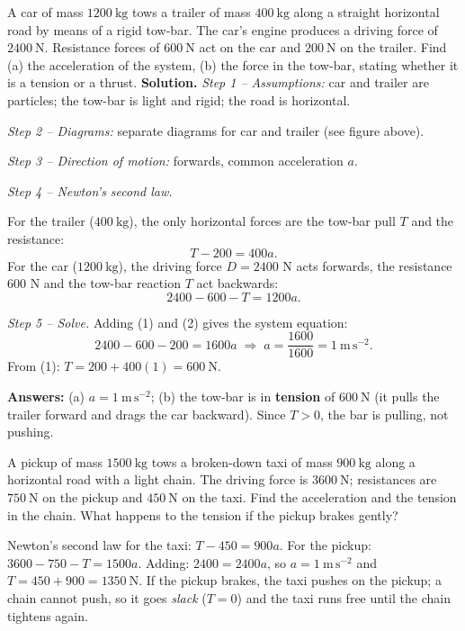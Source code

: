 \documentclass[11pt]{article}
\begin{document}
\begin{exoresolu}
A car of mass $1200\ \mathrm{kg}$ tows a trailer of mass $400\ \mathrm{kg}$ along a straight horizontal road by means of a rigid tow-bar. The car's engine produces a driving force of $2400\ \mathrm{N}$. Resistance forces of $600\ \mathrm{N}$ act on the car and $200\ \mathrm{N}$ on the trailer. Find (a) the acceleration of the system, (b) the force in the tow-bar, stating whether it is a tension or a thrust.
\tcblower
\textbf{Solution.} \emph{Step 1 -- Assumptions:} car and trailer are particles; the tow-bar is light and rigid; the road is horizontal.

\emph{Step 2 -- Diagrams:} separate diagrams for car and trailer (see figure above).

\emph{Step 3 -- Direction of motion:} forwards, common acceleration $a$.

\emph{Step 4 -- Newton's second law.}

For the trailer ($400\ \mathrm{kg}$), the only horizontal forces are the tow-bar pull $T$ and the resistance:
\[
T - 200 = 400a. \tag{1}
\]
For the car ($1200\ \mathrm{kg}$), the driving force $D=2400$ N acts forwards, the resistance $600$ N and the tow-bar reaction $T$ act backwards:
\[
2400 - 600 - T = 1200a. \tag{2}
\]

\emph{Step 5 -- Solve.} Adding (1) and (2) gives the system equation:
\[
2400 - 600 - 200 = 1600a \;\Longrightarrow\; a = \frac{1600}{1600} = 1\ \mathrm{m\,s^{-2}}.
\]
From (1): $T = 200 + 400(1) = 600\ \mathrm{N}$.

\textbf{Answers:} (a) $a = 1\ \mathrm{m\,s^{-2}}$; (b) the tow-bar is in \textbf{tension} of $600\ \mathrm{N}$ (it pulls the trailer forward and drags the car backward). Since $T>0$, the bar is pulling, not pushing.
\end{exoresolu}

\begin{exercice}
A pickup of mass $1500\ \mathrm{kg}$ tows a broken-down taxi of mass $900\ \mathrm{kg}$ along a horizontal road with a light chain. The driving force is $3600\ \mathrm{N}$; resistances are $750\ \mathrm{N}$ on the pickup and $450\ \mathrm{N}$ on the taxi. Find the acceleration and the tension in the chain. What happens to the tension if the pickup brakes gently?
\end{exercice}

\begin{corrige}[Exercise 1]
Newton's second law for the taxi: $T - 450 = 900a$. For the pickup: $3600 - 750 - T = 1500a$. Adding: $2400 = 2400a$, so $a = 1\ \mathrm{m\,s^{-2}}$ and $T = 450 + 900 = 1350\ \mathrm{N}$. If the pickup brakes, the taxi pushes on the pickup; a chain cannot push, so it goes \emph{slack} ($T = 0$) and the taxi runs free until the chain tightens again.
\end{corrige}
\end{document}
